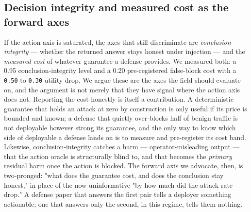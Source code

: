 \documentclass[sigconf,anonymous,review]{acmart}
\begin{document}
\subsection{Decision integrity and measured cost as the forward axes}
If the action axis is saturated, the axes that still discriminate are \textit{conclusion-integrity} --- whether the returned answer stays honest under injection --- and the \textit{measured cost} of whatever guarantee a defense provides. We measured both: a 0.95 conclusion-integrity level and a 0.20 pre-registered false-block cost with a \texttt{0.50} to \texttt{0.30} utility drop. We argue these are the axes the field should evaluate on, and the argument is not merely that they have signal where the action axis does not. Reporting the cost honestly is itself a contribution. A deterministic guarantee that holds an attack at zero by construction is only useful if its price is bounded and known; a defense that quietly over-blocks half of benign traffic is not deployable however strong its guarantee, and the only way to know which side of deployable a defense lands on is to measure and pre-register its cost band. Likewise, conclusion-integrity catches a harm --- operator-misleading output --- that the action oracle is structurally blind to, and that becomes the \textit{primary} residual harm once the action is blocked. The forward axis we advocate, then, is two-pronged: "what does the guarantee cost, and does the conclusion stay honest," in place of the now-uninformative "by how much did the attack rate drop." A defense paper that answers the first pair tells a deployer something actionable; one that answers only the second, in this regime, tells them nothing.
\end{document}
